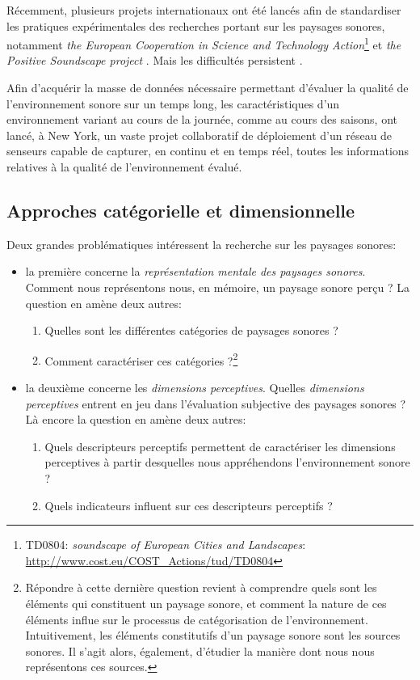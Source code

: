 {Récemment, plusieurs projets internationaux ont été lancés afin de standardiser les pratiques expérimentales des recherches portant sur les paysages sonores, notamment \emph{the European Cooperation in Science and Technology Action}\footnote{TD0804: \emph{soundscape of European Cities and Landscapes}: \url{http://www.cost.eu/COST_Actions/tud/TD0804}} \citep{schulte2010soundscape} et \emph{the Positive Soundscape project} \citep{salford2106,davies2013perception}. Mais les difficultés persistent \citep{schulte2013soundscape,ribeiro2013heart}. 

Afin d'acquérir la masse de données nécessaire permettant d'évaluer la qualité de l'environnement sonore sur un temps long, les caractéristiques d'un environnement variant au cours de la journée, comme au cours des saisons, \citep{park14} ont lancé, à New York, un vaste projet collaboratif de déploiement d'un réseau de senseurs capable de capturer, en continu et en temps réel, toutes les informations relatives à la qualité de l’environnement évalué.

\subsection{Approches catégorielle et dimensionnelle}
\label{sec:ch3_appCatDim}

Deux grandes problématiques intéressent la recherche sur les paysages sonores:

\begin{itemize}
\item la première concerne la \emph{représentation mentale des paysages sonores}. Comment nous représentons nous, en mémoire, un paysage sonore perçu ? La question en amène deux autres:

\begin{enumerate}
\item Quelles sont les différentes catégories de paysages sonores ?
\item Comment caractériser ces catégories ?\footnote{Répondre à cette dernière question revient à comprendre quels sont les éléments qui constituent un paysage sonore, et comment la nature de ces éléments influe sur le processus de catégorisation de l'environnement. Intuitivement, les éléments constitutifs d'un paysage sonore sont les sources sonores. Il s'agit alors, également, d'étudier la manière dont nous nous représentons ces sources.}
\end{enumerate}

\item la deuxième concerne les \emph{dimensions perceptives}.  Quelles \emph{dimensions perceptives} entrent en jeu dans l'évaluation subjective des paysages sonores ?  Là encore la question en amène deux autres:
\begin{enumerate}
\item Quels descripteurs perceptifs permettent de caractériser les dimensions perceptives à partir desquelles nous appréhendons l'environnement sonore ?
\item Quels indicateurs influent sur ces descripteurs perceptifs ?
\end{enumerate}


\end{itemize}}

